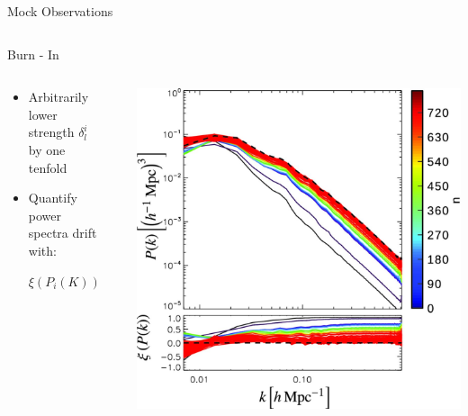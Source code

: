 \documentclass[10pt]{beamer}
\begin{document}
\begin{frame}[fragile]{Mock Observations}
\begin{columns}
\begin{column}{0.7\textwidth}
             \begin{center}
                    \begingroup\makeatletter{}\check@mathfonts
                \endgroup
            \end{center}
        \end{column}
    \end{columns}

\end{frame}
\begin{frame}[fragile]{Burn - In}

 \begin{columns}
        \begin{column}{0.7\textwidth} %
         \begin{itemize}
             \item Arbitrarily lower strength $\delta_l^i$ by one tenfold
             \item Quantify power spectra drift with:
             \begin{center}
        \begingroup\makeatletter{}\check@mathfonts
            $\xi\left(P_i(K)\right)=1-\frac{P_i(k)}{P^0(k)}$
            \endgroup
        \end{center}\pause
         \end{itemize} 
        \end{column}\\
        \begin{column}{0.35\textwidth} %
            \includegraphics[width=1.1\textwidth]{stt449fig11.jpeg}


\end{column}
\end{columns}
\end{frame}
\end{document}
